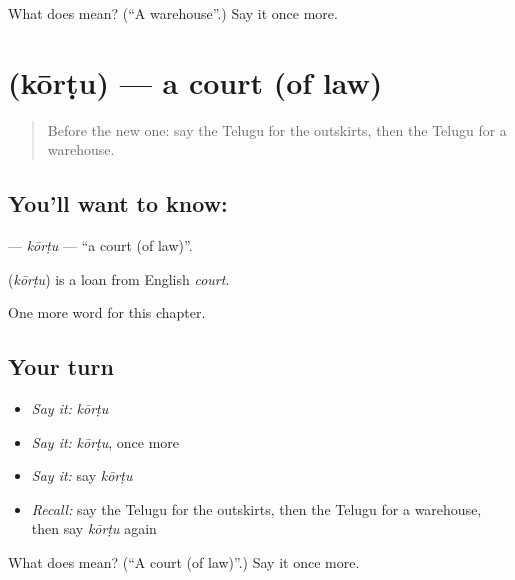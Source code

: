 \begin{tcolorbox}[breakable,colback=teal!4,colframe=teal!35!black,title={Before you move on}]
What does  mean? (\textquotedblleft{}A warehouse\textquotedblright{}.) Say it once more.
\end{tcolorbox}
\section[\texorpdfstring{\te{కోర్టు} (kōrṭu)}{కోర్టు (kōrṭu)}]{ (kōrṭu) — a court (of law)}

\label{lesson:TE-C256-kortu}



\begin{quote}
Before the new one: say the Telugu for the outskirts, then the Telugu for a warehouse.
\end{quote}

\subsection*{You'll want to know: }
\textbf{} — \emph{kōrṭu} — \textquotedblleft{}a court (of law)\textquotedblright{}.

\begin{cousinweb}
\textbf{} (\emph{kōrṭu}) is a loan from English \emph{court}.
\end{cousinweb}

\begin{grammarlens}[title={What you've built}]
One more word for this chapter.
\end{grammarlens}

\subsection*{Your turn}
\begin{itemize}
\raggedright
  \item \emph{Say it:} \emph{kōrṭu}
  \item \emph{Say it:} \emph{kōrṭu}, once more
  \item \emph{Say it:} say \emph{kōrṭu}
  \item \emph{Recall:} say the Telugu for the outskirts, then the Telugu for a warehouse, then say \emph{kōrṭu} again
\end{itemize}

\begin{tcolorbox}[breakable,colback=teal!4,colframe=teal!35!black,title={Before you move on}]
What does  mean? (\textquotedblleft{}A court (of law)\textquotedblright{}.) Say it once more.
\end{tcolorbox}
